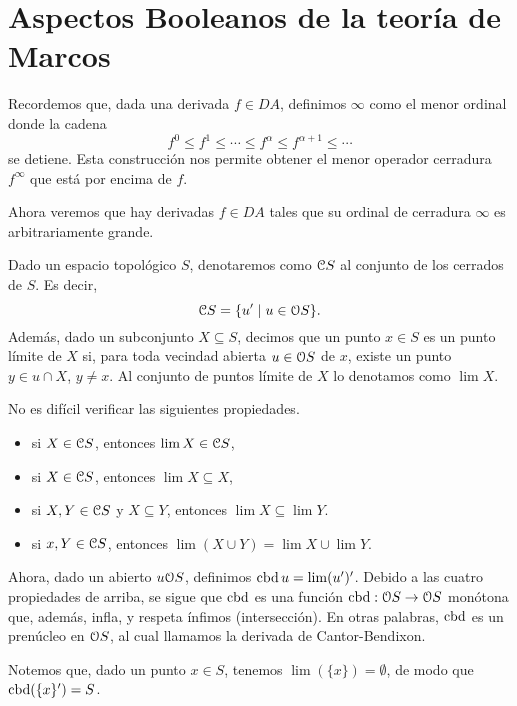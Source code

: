 \chapter{Aspectos Booleanos de la teoría de Marcos}




Recordemos que, dada una derivada $f\in DA$,
definimos $\infty$ como el menor ordinal donde la cadena
\[
    f^0\leq f^1\leq \cdots\leq f^\alpha \leq f^{\alpha+1} \leq \cdots
\]
se detiene.
Esta construcción nos permite obtener
el menor operador cerradura $f^\infty$
que está por encima de $f$.

Ahora veremos que hay derivadas $f\in DA$ tales que
su ordinal de cerradura $\infty$ es arbitrariamente grande.

Dado un espacio topológico $S$,
denotaremos como $\cal CS$ al conjunto de los cerrados de $S$.
Es decir,
\[
    \cal CS = \{u'\mid u\in\cal OS\}
.\]
Además, dado un subconjunto $X\subseteq S$,
decimos que un punto $x\in S$ es un punto límite de $X$ si,
para toda vecindad abierta $u\in\cal OS$ de $x$,
existe un punto $y\in u\cap X$, $y\neq x$.
Al conjunto de puntos límite de $X$ lo denotamos como $\lim X$.

No es difícil verificar las siguientes propiedades.
\begin{itemize}
    \item si $X\in\cal CS$, entonces $\lim X\in\cal CS$,
    \item si $X\in\cal CS$, entonces $\lim X\subseteq X$,
    \item si $X,Y\in\cal CS$ y $X\subseteq Y$,
        entonces $\lim X\subseteq\lim Y$.
    \item si $x,Y\in\cal CS$,
        entonces $\lim(X\cup Y)=\lim X\cup\lim Y$.
\end{itemize}

Ahora, dado un abierto $u\cal OS$, definimos $\cbd u = \lim(u')'$.
Debido a las cuatro propiedades de arriba,
se sigue que $\cbd$ es una función $\cbd:\cal OS\to\cal OS$
monótona que, además, infla, y respeta ínfimos (intersección).
En otras palabras, $\cbd$ es un prenúcleo en $\cal OS$,
al cual llamamos la derivada de Cantor-Bendixon.

Notemos que, dado un punto $x\in S$,
tenemos $\lim(\{x\})=\emptyset$,
de modo que $\cbd(\{x\}')=S$.

